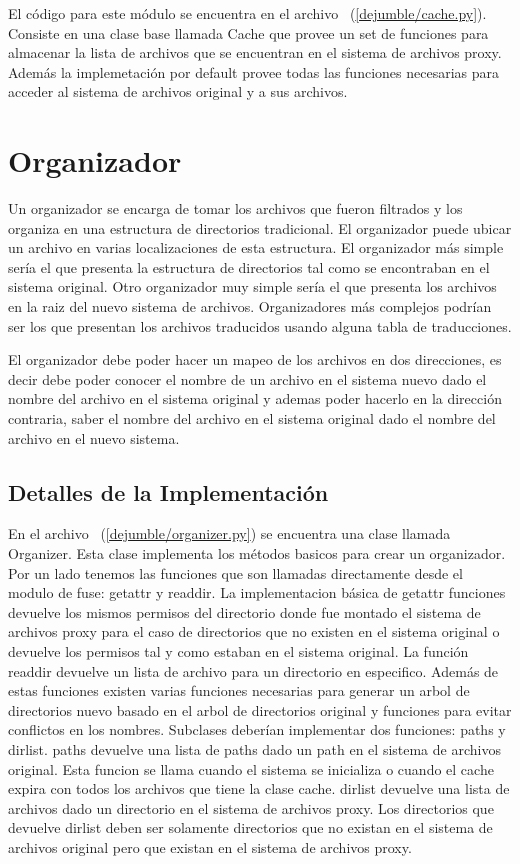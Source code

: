 El código para este módulo se encuentra en el archivo ~(\ref{dejumble/cache.py}). Consiste en una clase base llamada Cache que provee un set de funciones para almacenar la lista de archivos que se encuentran en el sistema de archivos proxy. Además la implemetación por default provee todas las funciones necesarias para acceder al sistema de archivos original y a sus archivos. 


\section{Organizador}

Un organizador se encarga de tomar los archivos que fueron filtrados y los organiza en una estructura de directorios tradicional. El organizador puede ubicar un archivo en varias localizaciones de esta estructura. El organizador más simple sería el que presenta la estructura de directorios tal como se encontraban en el sistema original. Otro organizador muy simple sería el que presenta los archivos en la raiz del nuevo sistema de archivos. Organizadores más complejos podrían ser los que presentan los archivos traducidos usando alguna tabla de traducciones.

El organizador debe poder hacer un mapeo de los archivos en dos direcciones, es decir debe poder conocer el nombre de un archivo en el sistema nuevo dado el nombre del archivo en el sistema original y ademas poder hacerlo en la dirección contraria, saber el nombre del archivo en el sistema original dado el nombre del archivo en el nuevo sistema.

\subsection{Detalles de la Implementación}

En el archivo ~(\ref{dejumble/organizer.py}) se encuentra una clase llamada Organizer. Esta clase implementa los métodos basicos para crear un organizador. Por un lado tenemos las funciones que son llamadas directamente desde el modulo de fuse: getattr y readdir. La implementacion básica de getattr funciones devuelve los mismos permisos del directorio donde fue montado el sistema de archivos proxy para el caso de directorios que no existen en el sistema original o devuelve los permisos tal y como estaban en el sistema original. La función readdir devuelve un lista de archivo para un directorio en especifico. Además de estas funciones existen varias funciones necesarias para generar un arbol de directorios nuevo basado en el arbol de directorios original y funciones para evitar conflictos en los nombres. Subclases deberían implementar dos funciones: paths y dirlist. paths devuelve una lista de paths dado un path en el sistema de archivos original. Esta funcion se llama cuando el sistema se inicializa o cuando el cache expira con todos los archivos que tiene la clase cache. dirlist devuelve una lista de archivos dado un directorio en el sistema de archivos proxy. Los directorios que devuelve dirlist deben ser solamente directorios que no existan en el sistema de archivos original pero que existan en el sistema de archivos proxy.


